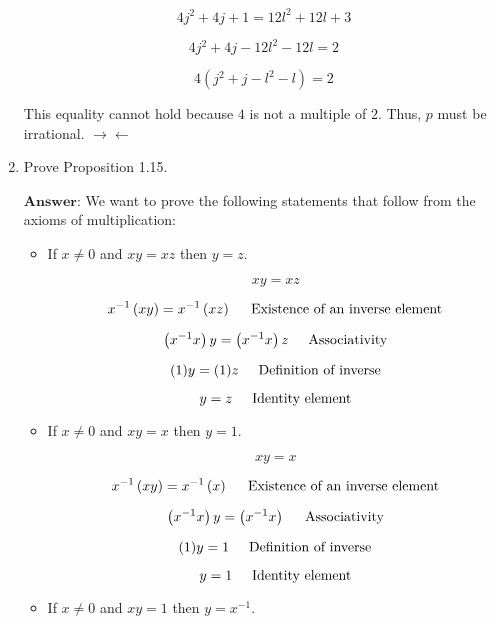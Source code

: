\documentclass[12pt]{article}
\begin{document}
\begin{enumerate}
    \[4j^2 + 4j + 1 = 12l^2 + 12l + 3\]

    \[4j^2 + 4j -  12l^2 - 12l = 2\]

    \[4\left(j^2 + j - l^2 - l\right) = 2\]

    This equality cannot hold because $4$ is not a multiple of $2$. Thus, $p$ must be irrational. $\rightarrow \leftarrow$

    
    
    \item Prove Proposition 1.15.
    
     $\textbf{Answer:}$ We want to prove the following statements that follow from the axioms of multiplication:

     \begin{itemize}
        \item If $x \neq 0$ and $xy = xz$ then $y = z$.
        
        \[xy = xz\]

        \[x^{-1}\left(xy\right) = x^{-1}\left(xz\right) \hspace{0.5cm} \text{Existence of an inverse element}\]

        \[\left(x^{-1}x\right)y = \left(x^{-1}x\right)z \hspace{0.5cm} \text{Associativity}\]

        \[(1)y = (1)z \hspace{0.5cm} \text{Definition of inverse}\]

        \[y = z \hspace{0.5cm} \text{Identity element}\]

        \item If $x \neq 0$ and $xy = x$ then $y = 1$.
        
        \[xy = x\]

        \[x^{-1}\left(xy\right) = x^{-1}\left(x\right) \hspace{0.5cm} \text{Existence of an inverse element}\]

        \[\left(x^{-1}x\right)y = \left(x^{-1} x\right) \hspace{0.5cm} \text{Associativity}\]

        \[(1)y = 1 \hspace{0.5cm} \text{Definition of inverse}\]

        \[y = 1 \hspace{0.5cm} \text{Identity element}\]

        \item If $x \neq 0$ and $xy = 1$ then $y = x^{-1}$.
        

\end{itemize}
\end{enumerate}
\end{document}
